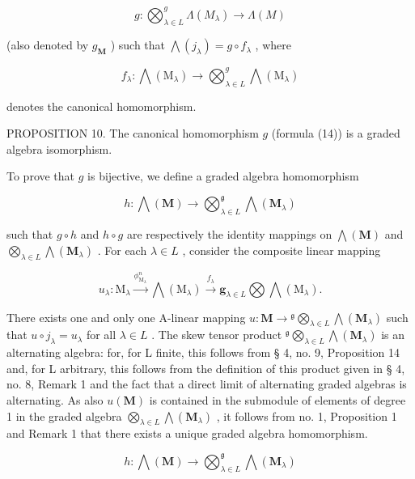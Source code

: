 \[
g \colon \bigotimes_ {\lambda \in L} ^ {g} \Lambda (M _ {\lambda}) \to \Lambda (M)\tag{14}
\]

(also denoted by \(g_{\mathbf{M}}\) ) such that \(\bigwedge (j_{\lambda}) = g \circ f_{\lambda}\) , where

\[
f _ {\lambda}: \bigwedge (\mathrm{M} _ {\lambda}) \rightarrow \bigotimes_ {\lambda \in L} ^ {g} \bigwedge (\mathrm{M} _ {\lambda})
\]

denotes the canonical homomorphism.

PROPOSITION 10. The canonical homomorphism \(g\) (formula (14)) is a graded algebra isomorphism.

To prove that \(g\) is bijective, we define a graded algebra homomorphism

\[
h: \bigwedge (\mathbf {M}) \rightarrow \bigotimes_ {\lambda \in L} ^ {\mathfrak {g}} \bigwedge (\mathbf {M} _ {\lambda})\tag{15}
\]

such that \(g \circ h\) and \(h \circ g\) are respectively the identity mappings on \(\bigwedge(\mathbf{M})\) and \(\bigotimes_{\lambda \in L} \bigwedge(\mathbf{M}_{\lambda})\) . For each \(\lambda \in L\) , consider the composite linear mapping

\[
u _ {\lambda}: \mathrm{M} _ {\lambda} \xrightarrow {\phi_ {\mathrm{M} _ {\lambda}} ^ {n}} \bigwedge (\mathrm{M} _ {\lambda}) \xrightarrow {f _ {\lambda}} \mathbf {g} _ {\lambda \in L} \bigotimes \bigwedge (\mathrm{M} _ {\lambda}).
\]

There exists one and only one A-linear mapping \(u: \mathbf{M} \to {}^{\mathfrak{g}} \bigotimes_{\lambda \in L} \bigwedge (\mathbf{M}_{\lambda})\) such that \(u \circ j_{\lambda} = u_{\lambda}\) for all \(\lambda \in L\) . The skew tensor product \({}^{\mathfrak{g}} \bigotimes_{\lambda \in L} \bigwedge (\mathbf{M}_{\lambda})\) is an alternating algebra: for, for L finite, this follows from § 4, no. 9, Proposition 14 and, for L arbitrary, this follows from the definition of this product given in § 4, no. 8, Remark 1 and the fact that a direct limit of alternating graded algebras is alternating. As also \(u(\mathbf{M})\) is contained in the submodule of elements of degree 1 in the graded algebra \(\bigotimes_{\lambda \in L} \bigwedge (\mathbf{M}_{\lambda})\) , it follows from no. 1, Proposition 1 and Remark 1 that there exists a unique graded algebra homomorphism.

\[
h: \bigwedge (\mathbf {M}) \rightarrow \bigotimes_ {\lambda \in L} ^ {\mathfrak {g}} \bigwedge (\mathbf {M} _ {\lambda})
\]


